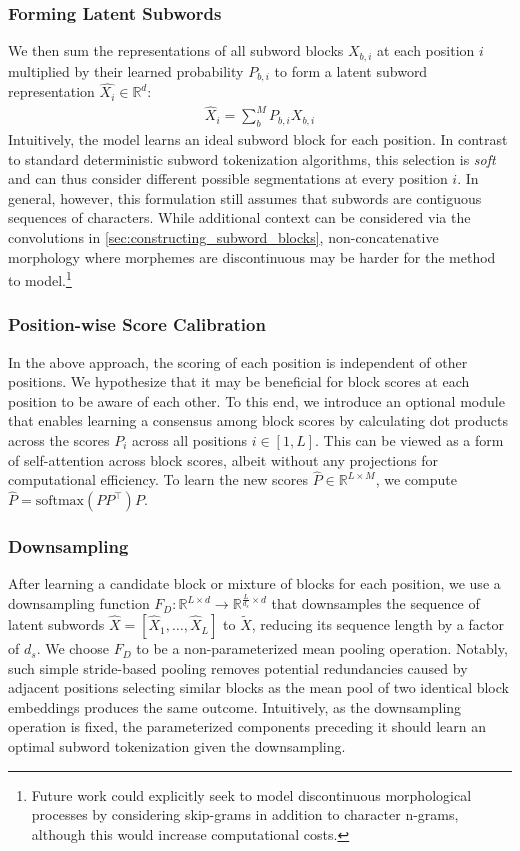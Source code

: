 \documentclass{article} \usepackage{iclr2022_conference,times}
\newcommand{\softmax}{\mathrm{softmax}}
\begin{document}
\subsubsection{Forming Latent Subwords} \label{sec:latent_subwords}

We then sum the representations of all subword blocks $X_{b, i}$ at each position $i$ multiplied by their learned probability $P_{b, i}$ to form a latent subword representation $\hat{X_i} \in \mathbb{R}^d$:
\begin{align}
\hat{X}_i = \sum^{M}_b P_{b,i} X_{b,i}    
\end{align}
Intuitively, the model learns an ideal subword block for each position. In contrast to standard deterministic subword tokenization algorithms, this selection is \emph{soft} and can thus consider different possible segmentations at every position $i$. In general, however, this formulation still assumes that subwords are contiguous sequences of characters. While additional context can be considered via the convolutions in \textsection \ref{sec:constructing_subword_blocks}, non-concatenative morphology where morphemes are discontinuous may be harder for the method to model.\footnote{Future work could explicitly seek to model discontinuous morphological processes by considering skip-grams in addition to character n-grams, although this would increase computational costs.}



\subsubsection{Position-wise Score Calibration}
In the above approach, the scoring of each position is independent of other positions. We hypothesize that it may be beneficial for block scores at each position to be aware of each other. To this end, we introduce an optional module that enables learning a consensus among block scores by calculating dot products across the scores $P_i$ across all positions $i \in [1,L]$. This can be viewed as a form of self-attention across block scores, albeit without any projections for computational efficiency. To learn the new scores $\hat{P} \in \mathbb{R}^{L \times M}$, we compute $\hat{P} = \softmax(PP^\top)P.$

\subsubsection{Downsampling}
After learning a candidate block or mixture of blocks for each position, we use a downsampling function $F_D: \mathbb{R}^{L \times d} \rightarrow \mathbb{R}^{\frac{L}{d_s} \times d}$ that downsamples the sequence of latent subwords $\hat{X} = [\hat{X}_1, \ldots, \hat{X}_L]$ to $\tilde{X}$, reducing its sequence length by a factor of $d_s$.
We choose $F_D$ to be a non-parameterized mean pooling operation. Notably, such simple stride-based pooling removes potential redundancies caused by adjacent positions selecting similar blocks as the mean pool of two identical block embeddings produces the same outcome. Intuitively, as the downsampling operation is fixed, the parameterized components preceding it should learn an optimal subword tokenization given the downsampling.
\end{document}
